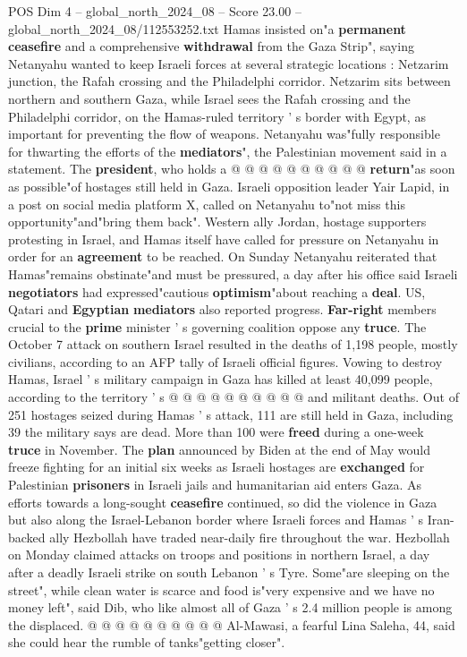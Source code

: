 \begin{textsample}{POS Dim 4 – global\_north\_2024\_08 – Score 23.00 – global\_north\_2024\_08/112553252.txt}
Hamas insisted on"a \textbf{permanent} \textbf{ceasefire} and a comprehensive \textbf{withdrawal} from the Gaza Strip", saying Netanyahu wanted to keep Israeli forces at several strategic locations : Netzarim junction, the Rafah crossing and the Philadelphi corridor.
Netzarim sits between northern and southern Gaza, while Israel sees the Rafah crossing and the Philadelphi corridor, on the Hamas-ruled territory ' s border with Egypt, as important for preventing the flow of weapons.
Netanyahu was"fully responsible for thwarting the efforts of the \textbf{mediators}", the Palestinian movement said in a statement.
The \textbf{president}, who holds a @ @ @ @ @ @ @ @ @ @ \textbf{return}"as soon as possible"of hostages still held in Gaza.
Israeli opposition leader Yair Lapid, in a post on social media platform X, called on Netanyahu to"not miss this opportunity"and"bring them back".
Western ally Jordan, hostage supporters protesting in Israel, and Hamas itself have called for pressure on Netanyahu in order for an \textbf{agreement} to be reached.
On Sunday Netanyahu reiterated that Hamas"remains obstinate"and must be pressured, a day after his office said Israeli \textbf{negotiators} had expressed"cautious \textbf{optimism}"about reaching a \textbf{deal}.
US, Qatari and \textbf{Egyptian} \textbf{mediators} also reported progress. \textbf{Far-right} members crucial to the \textbf{prime} minister ' s governing coalition oppose any \textbf{truce}.
The October 7 attack on southern Israel resulted in the deaths of 1,198 people, mostly civilians, according to an AFP tally of Israeli official figures.
Vowing to destroy Hamas, Israel ' s military campaign in Gaza has killed at least 40,099 people, according to the territory ' s @ @ @ @ @ @ @ @ @ @ and militant deaths.
Out of 251 hostages seized during Hamas ' s attack, 111 are still held in Gaza, including 39 the military says are dead.
More than 100 were \textbf{freed} during a one-week \textbf{truce} in November.
The \textbf{plan} announced by Biden at the end of May would freeze fighting for an initial six weeks as Israeli hostages are \textbf{exchanged} for Palestinian \textbf{prisoners} in Israeli jails and humanitarian aid enters Gaza.
As efforts towards a long-sought \textbf{ceasefire} continued, so did the violence in Gaza but also along the Israel-Lebanon border where Israeli forces and Hamas ' s Iran-backed ally Hezbollah have traded near-daily fire throughout the war.
Hezbollah on Monday claimed attacks on troops and positions in northern Israel, a day after a deadly Israeli strike on south Lebanon ' s Tyre.
Some"are sleeping on the street", while clean water is scarce and food is"very expensive and we have no money left", said Dib, who like almost all of Gaza ' s 2.4 million people is among the displaced. @ @ @ @ @ @ @ @ @ @ Al-Mawasi, a fearful Lina Saleha, 44, said she could hear the rumble of tanks"getting closer".

\end{textsample}
